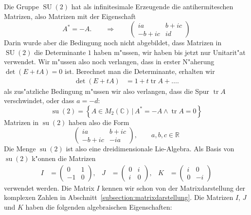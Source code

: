 \begin{beispiel}
Die Gruppe $\operatorname{SU}(2)$ hat als infinitesimale Erzeugende 
die antihermiteschen Matrizen, also Matrizen mit der Eigenschaft
\[
A^*=-A.
\qquad
\Rightarrow
\qquad
\begin{pmatrix}
   ia&b+ic\\
-b+ic&  id
\end{pmatrix}
\]
Darin wurde aber die Bedingung noch nicht abgebildet, dass Matrizen
in $\operatorname{SU}(2)$ die Determinante $1$ haben m"ussen, wir
haben bis jetzt nur Unitarit"at verwendet. Wir m"ussen also noch
verlangen, dass in erster N"aherung $\det(E+tA)=0$ ist.
Berechnet man die Determinante, erhalten wir
\begin{align*}
\det(E+tA)
&=
1+t \operatorname{tr}A + \dots.
\end{align*}
als zus"atzliche Bedingung m"ussen wir also verlangen, dass die Spur
$\operatorname{tr}A$ verschwindet, oder dass $a=-d$:
\begin{equation}
\operatorname{su}(2)
=
\left\{ A\in M_2(\mathbb C)\,|\,
A^*=-A\wedge \operatorname{tr}A=0
\right\}
\end{equation}
Matrizen in $\operatorname{su}(2)$ haben also die Form
\begin{equation}
\begin{pmatrix}
   ia&b+ic\\
-b+ic& -ia
\end{pmatrix},\qquad a,b,c\in\mathbb R
\end{equation}
Die Menge $\operatorname{su}(2)$ ist also eine dreidimensionale 
Lie-Algebra.
Als Basis von $\operatorname{su}(2)$ k"onnen die Matrizen
\begin{align}
I
&=
\begin{pmatrix} 0&1 \\ -1& 0 \end{pmatrix},
&
J
&=
\begin{pmatrix} 0&i \\  i& 0 \end{pmatrix},
&
K
&=
\begin{pmatrix} i&0 \\  0&-i \end{pmatrix}
\label{komplex:definitionIJK}
\end{align}
verwendet werden.
Die Matrix $I$ kennen wir schon von der Matrixdarstellung der komplexen
Zahlen in Abschnitt~\ref{subsection:matrixdarstellung}.
Die Matrizen $I$, $J$ und $K$ haben die folgenden algebraischen
Eigenschaften:
\begin{align*}

\end{align*}
\end{beispiel}
